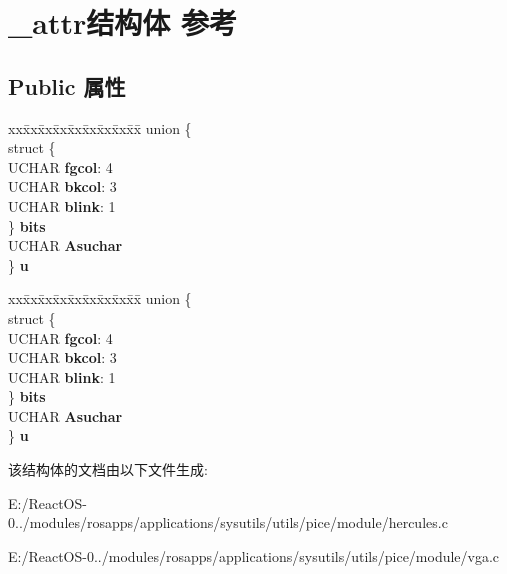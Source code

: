 \hypertarget{struct__attr}{}\section{\+\_\+attr结构体 参考}
\label{struct__attr}
\subsection*{Public 属性}
\begin{DoxyCompactItemize}
\item 
\mbox{\label{struct__attr_a265c6ef457ea74842643d1ace2276e67}} 
\begin{tabbing}
xx\=xx\=xx\=xx\=xx\=xx\=xx\=xx\=xx\=\kill
union \{\\
\>struct \{\\
\>\>UCHAR {\bfseries fgcol}: 4\\
\>\>UCHAR {\bfseries bkcol}: 3\\
\>\>UCHAR {\bfseries blink}: 1\\
\>\} {\bfseries bits}\\
\>UCHAR {\bfseries Asuchar}\\
\} {\bfseries u}\\

\end{tabbing}\item 
\mbox{\label{struct__attr_a0b3f19b50c2028cb58019e51d2edb80c}} 
\begin{tabbing}
xx\=xx\=xx\=xx\=xx\=xx\=xx\=xx\=xx\=\kill
union \{\\
\>struct \{\\
\>\>UCHAR {\bfseries fgcol}: 4\\
\>\>UCHAR {\bfseries bkcol}: 3\\
\>\>UCHAR {\bfseries blink}: 1\\
\>\} {\bfseries bits}\\
\>UCHAR {\bfseries Asuchar}\\
\} {\bfseries u}\\

\end{tabbing}\end{DoxyCompactItemize}


该结构体的文档由以下文件生成\+:\begin{DoxyCompactItemize}
\item 
E\+:/\+React\+O\+S-\/0../modules/rosapps/applications/sysutils/utils/pice/module/hercules.\+c\item 
E\+:/\+React\+O\+S-\/0../modules/rosapps/applications/sysutils/utils/pice/module/vga.\+c\end{DoxyCompactItemize}
